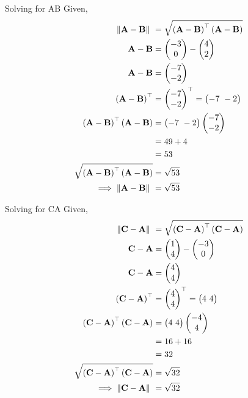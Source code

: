 \documentclass[11pt]{book}
\begin{document}
\begin{enumerate}[label=\thesection.\arabic*.,ref=\thesection.\theenumi]
Solving for AB 
Given, 
\begin{align}  
 \norm{\vec{A}-\vec{B}}\ &=  \sqrt{\brak{\vec{A}-\vec{B}}^{\top}\brak{\vec{A}-\vec{B}}} \\
 \vec{A}-\vec{B} &= \myvec{-3\\ 0} - \myvec{4 \\ 2} \\
 \vec{A}-\vec{B} &= \myvec{-7 \\ -2} \\
 \brak{\vec{A}-\vec{B}}^{\top} &= {\myvec{-7 \\ -2}}^{\top} = \myvec{-7 \ -2} \\
\brak{\vec{A}-\vec{B}}^{\top}\brak{\vec{A}-\vec{B}} &= \myvec{-7 \ -2} \myvec{-7 \\ -2}\\
             &= 49 + 4 \\
             &= 53 \\  
	\sqrt{\brak{\vec{A}-\vec{B}}^{\top}\brak{\vec{A}-\vec{B}}} &= \sqrt{53}	\\
	\implies \norm{\vec{A}-\vec{B}}\ &= \sqrt{53} 
\end{align}

Solving for CA
Given, 
\begin{align}  
	\norm{\vec{C}-\vec{A}}\ &=  \sqrt{\brak{\vec{C}-\vec{A}}^{\top}\brak{\vec{C}-\vec{A}}} \\
 \vec{C}-\vec{A} &= \myvec{1 \\ 4} - \myvec{-3 \\ 0} \\
 \vec{C}-\vec{A} &= \myvec{4 \\ 4} \\
 \brak{\vec{C}-\vec{A}}^{\top} &= {\myvec{4 \\ 4}}^{\top} = \myvec{4 \ 4} \\
	\brak{\vec{C}-\vec{A}}^{\top}\brak{\vec{C}-\vec{A}} &= \myvec{4\ 4} \myvec{-4 \\ 4}\\
             &= 16 + 16 \\
             &= 32 \\  
	\sqrt{\brak{\vec{C}-\vec{A}}^{\top}\brak{\vec{C}-\vec{A}}} &= \sqrt{32}	\\
	\implies \norm{\vec{C}-\vec{A}}\ &= \sqrt{32} 
\end{align}




\end{enumerate}
\end{document}
